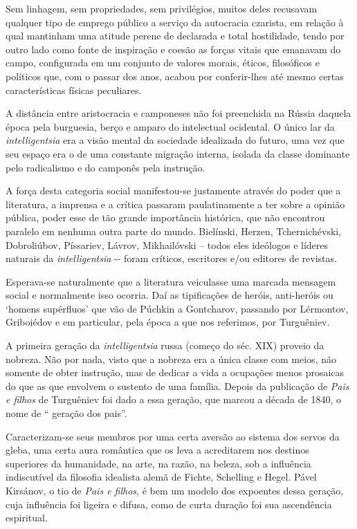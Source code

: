 Sem linhagem, sem propriedades, sem privilégios, muitos deles recusavam
qualquer tipo de emprego público a serviço da autocracia czarista, em
relação à qual mantinham uma atitude perene de declarada e total
hostilidade, tendo por outro lado como fonte de inspiração e coesão as
forças vitais que emanavam do campo, configurada em um conjunto de
valores morais, éticos, filosóficos e políticos que, com o passar dos
anos, acabou por conferir-lhes até mesmo certas características físicas
peculiares.

A distância entre aristocracia e camponeses não foi preenchida na Rússia
daquela época pela burguesia, berço e amparo do intelectual ocidental. O
único lar da \emph{intelligentsia} era a visão mental da sociedade
idealizada do futuro, uma vez que seu espaço era o de uma constante
migração interna, isolada da classe dominante pelo radicalismo e do
camponês pela instrução.

A força desta categoria social manifestou-se justamente através do poder
que a literatura, a imprensa e a crítica passaram paulatinamente a ter
sobre a opinião pública, poder esse de tão grande importância histórica,
que não encontrou paralelo em nenhuma outra parte do mundo. Bielínski,
Herzen, Tchernichévski, Dobroliúbov, Píssariev, Lávrov, Mikhailóvski --
todos eles ideólogos e líderes naturais da \emph{intelligentsia} -\/-
foram críticos, escritores e/ou editores de revistas.

Esperava-se naturalmente que a literatura veiculasse uma marcada
mensagem social e normalmente isso ocorria. Daí as tipificações de
heróis, anti-heróis ou `homens supérfluos' que vão de Púchkin a
Gontcharov, passando por Lérmontov, Griboiédov e em particular, pela
época a que nos referimos, por Turguêniev.

A primeira geração da \emph{intelligentsia} { } russa (começo do séc.
XIX) proveio da nobreza. Não por nada, visto que a nobreza era a única
classe com meios, não somente de obter instrução, mas de dedicar a vida
a ocupações menos prosaicas do que as que envolvem o sustento de uma
família. Depois da publicação de \emph{Pais e filhos} de Turguêniev foi
dado a essa geração, que marcou a década de 1840, o nome de `` geração
dos pais''.

Caracterizam-se seus membros por uma certa aversão ao sistema dos servos
da gleba, uma certa aura romântica que os leva a acreditarem nos
destinos superiores da humanidade, na arte, na razão, na beleza, sob a
influência indiscutível da filosofia idealista alemã de Fichte,
Schelling e Hegel. Pável Kirsánov, o tio de \emph{Pais e filhos}, é bem
um modelo dos expoentes dessa geração, cuja influência foi ligeira e
difusa, como de curta duração foi sua ascendência espiritual.

